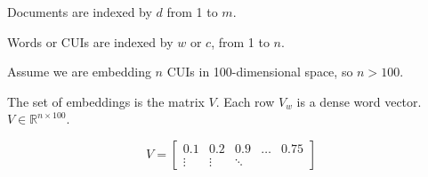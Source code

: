 \documentclass{article}
\begin{document}
Documents are indexed by $d$ from 1 to $m$.

Words or CUIs are indexed by $w$ or $c$, from 1 to $n$.

Assume we are embedding $n$ CUIs in 100-dimensional space, so $n > 100$.

The set of embeddings is the matrix $V$. Each row $V_w$ is a dense
word vector. $V \in \mathbb{R}^{n \times 100}$.

\begin{equation}
  V = \left[
      \begin{array}{ccccc}
        0.1 & 0.2 & 0.9 & \ldots & 0.75 \\
        \vdots & \vdots & \ddots
      \end{array} \right]
\end{equation}
\end{document}
